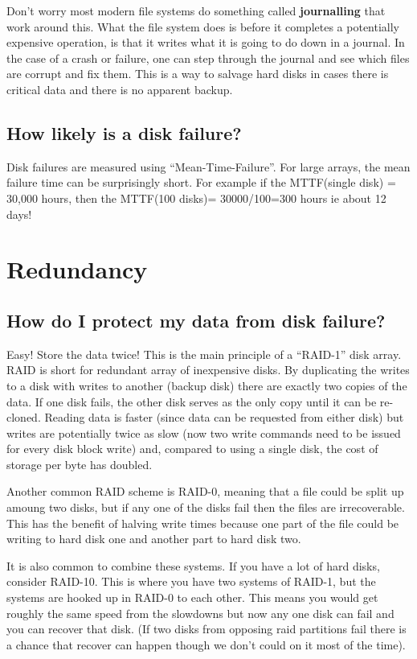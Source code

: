 Don't worry most modern file systems do something called \textbf{journalling} that work around this. What the file system does is before it completes a potentially expensive operation, is that it writes what it is going to do down in a journal. In the case of a crash or failure, one can step through the journal and see which files are corrupt and fix them. This is a way to salvage hard disks in cases there is critical data and there is no apparent backup.

\subsection{How likely is a disk failure?}\label{how-likely-is-a-disk-failure}

Disk failures are measured using ``Mean-Time-Failure''. For large arrays, the mean failure time can be surprisingly short. For example if the MTTF(single disk) = 30,000 hours, then the MTTF(100 disks)= 30000/100=300 hours ie about 12 days!

\section{Redundancy}\label{redundancy}

\subsection{How do I protect my data from disk failure?}\label{how-do-i-protect-my-data-from-disk-failure}

Easy! Store the data twice! This is the main principle of a ``RAID-1'' disk array. RAID is short for redundant array of inexpensive disks. By duplicating the writes to a disk with writes to another (backup disk) there are exactly two copies of the data. If one disk fails, the other disk serves as the only copy until it can be re-cloned. Reading data is faster (since data can be requested from either disk) but writes are potentially twice as slow (now two write commands need to be issued for every disk block write) and, compared to using a single disk, the cost of storage per byte has doubled.

Another common RAID scheme is RAID-0, meaning that a file could be split up amoung two disks, but if any one of the disks fail then the files are irrecoverable. This has the benefit of halving write times because one part of the file could be writing to hard disk one and another part to hard disk two.

It is also common to combine these systems. If you have a lot of hard disks, consider RAID-10. This is where you have two systems of RAID-1, but the systems are hooked up in RAID-0 to each other. This means you would get roughly the same speed from the slowdowns but now any one disk can fail and you can recover that disk. (If two disks from opposing raid partitions fail there is a chance that recover can happen though we don't could on it most of the time).

